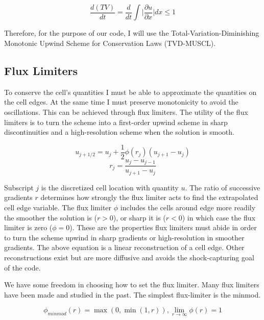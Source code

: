 \documentclass[12pt,upcase]{umlthesis}
\begin{document}
\begin{equation}\label{eq:tvd}
	\frac{d(TV)}{dt} = \frac{d}{dt} \int \lvert \frac{\partial u}{\partial x} \rvert dx \leq 1
\end{equation}

Therefore, for the purpose of our code, I will use the Total-Variation-Diminishing Monotonic Upwind Scheme for Conservation Laws (TVD-MUSCL).

\subsection{Flux Limiters}\label{sec:fluxlimiters}

To conserve the cell's quantities I must be able to approximate the quantities on the cell edges. At the same time I must preserve monotonicity to avoid the oscillations. This can be achieved through flux limiters. The utility of the flux limiters is to turn the scheme into a first-order upwind scheme in sharp discontinuities and a high-resolution scheme when the solution is smooth.

\begin{equation}\label{eq:fluxlimiter}
	u_{j+1/2} = u_j + \frac{1}{2} \phi(r_j) (u_{j+1} - u_j)
\end{equation}
\begin{equation}
	r_j = \frac{u_j - u_{j-1}}{u_{j+1} - u_j}
\end{equation}

Subscript $j$ is the discretized cell location with quantity $u$. The ratio of successive gradients $r$ determines how strongly the flux limiter acts to find the extrapolated cell edge variable. The flux limiter $\phi$ includes the cells around edge more readily the smoother the solution is ($r>0$), or sharp it is ($r<0$) in which case the flux limiter is zero ($\phi=0$). These are the properties flux limiters must abide in order to turn the scheme upwind in sharp gradients or high-resolution in smoother gradients. The above equation is a linear reconstruction of a cell edge. Other reconstructions exist but are more diffusive and avoids the shock-capturing goal of the code.

We have some freedom in choosing how to set the flux limiter. Many flux limiters have been made and studied in the past. The simplest flux-limiter is the minmod.

\begin{equation}\label{eq:minmod}
	\phi_{minmod}(r) = \max(0, \min(1, r)), \lim_{r \to \infty} \phi(r) = 1
\end{equation}
\end{document}
